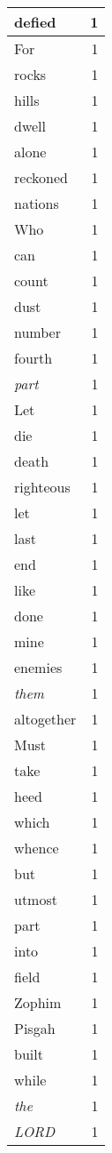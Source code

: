 \begin{center}
\begin{longtable}{l|r}
defied & 1\\ \hline 
For & 1\\ \hline 
rocks & 1\\ \hline 
hills & 1\\ \hline 
dwell & 1\\ \hline 
alone & 1\\ \hline 
reckoned & 1\\ \hline 
nations & 1\\ \hline 
Who & 1\\ \hline 
can & 1\\ \hline 
count & 1\\ \hline 
dust & 1\\ \hline 
number & 1\\ \hline 
fourth & 1\\ \hline 
\emph{part} & 1\\ \hline 
Let & 1\\ \hline 
die & 1\\ \hline 
death & 1\\ \hline 
righteous & 1\\ \hline 
let & 1\\ \hline 
last & 1\\ \hline 
end & 1\\ \hline 
like & 1\\ \hline 
done & 1\\ \hline 
mine & 1\\ \hline 
enemies & 1\\ \hline 
\emph{them} & 1\\ \hline 
altogether & 1\\ \hline 
Must & 1\\ \hline 
take & 1\\ \hline 
heed & 1\\ \hline 
which & 1\\ \hline 
whence & 1\\ \hline 
but & 1\\ \hline 
utmost & 1\\ \hline 
part & 1\\ \hline 
into & 1\\ \hline 
field & 1\\ \hline 
Zophim & 1\\ \hline 
Pisgah & 1\\ \hline 
built & 1\\ \hline 
while & 1\\ \hline 
\emph{the} & 1\\ \hline 
\emph{LORD} & 1\\ \hline 

\end{longtable}
\end{center}
